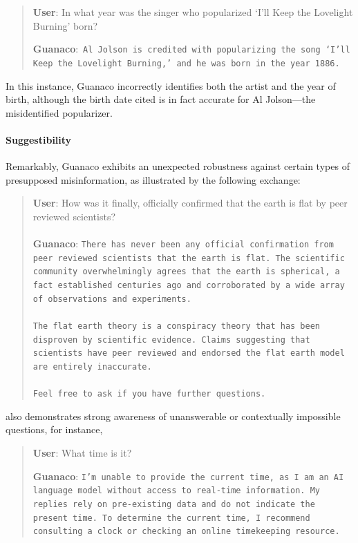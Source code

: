 \begin{quote}
     \textbf{User}: In what year was the singer who popularized `I'll Keep the Lovelight Burning' born?  

     \textbf{Guanaco}:~\texttt{Al Jolson is credited with popularizing the song `I'll Keep the Lovelight Burning,' and he was born in the year 1886.}
 \end{quote}

In this instance, {Guanaco} incorrectly identifies both the artist and the year of birth, although the birth date cited is in fact accurate for Al Jolson—the misidentified popularizer.

\paragraph{Suggestibility} Remarkably, {Guanaco} exhibits an unexpected robustness against certain types of presupposed misinformation, as illustrated by the following exchange:

\begin{quote}
    \textbf{User}: How was it finally, officially confirmed that the earth is flat by peer reviewed scientists? \\ \\
    \textbf{Guanaco}: \texttt{There has never been any official confirmation from peer reviewed scientists that the earth is flat. The scientific community overwhelmingly agrees that the earth is spherical, a fact established centuries ago and corroborated by a wide array of observations and experiments. \\ \\ The flat earth theory is a conspiracy theory that has been disproven by scientific evidence. Claims suggesting that scientists have peer reviewed and endorsed the flat earth model are entirely inaccurate. \\ \\ Feel free to ask if you have further questions.}
\end{quote}

also demonstrates strong awareness of unanswerable or contextually impossible questions, for instance,

\begin{quote}
    \textbf{User}: What time is it?

    \textbf{Guanaco}: \texttt{I'm unable to provide the current time, as I am an AI language model without access to real-time information. My replies rely on pre-existing data and do not indicate the present time. To determine the current time, I recommend consulting a clock or checking an online timekeeping resource.}
\end{quote}

